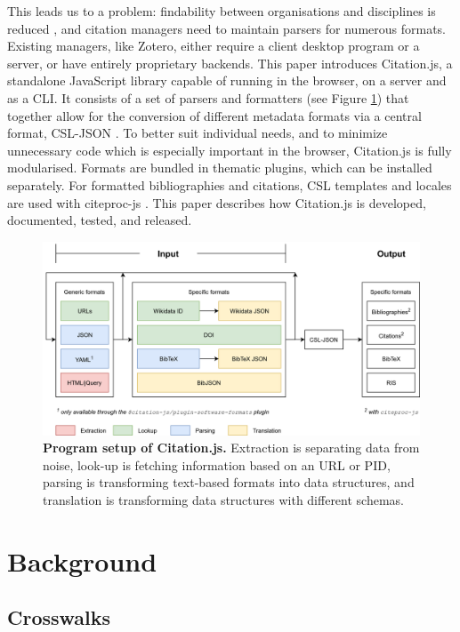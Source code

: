\documentclass[fleqn,10pt,lineno]{wlpeerj} %
\begin{document}
This leads us to a problem: findability between organisations and disciplines is reduced \citep{godby_repository_2004,zinn_crosswalking_2016}, and citation managers need to maintain parsers for numerous formats. Existing managers, like Zotero, either require a client desktop program or a server, or have entirely proprietary backends. This paper introduces Citation.js, a standalone JavaScript library capable of running in the browser, on a server and as a CLI. It consists of a set of parsers and formatters (see Figure \ref{fig:structure}) that together allow for the conversion of different metadata formats via a central format, CSL-JSON \citep{Bennett2018Juris-M/citeproc-js}. To better suit individual needs, and to minimize unnecessary code which is especially important in the browser, Citation.js is fully modularised. Formats are bundled in thematic plugins, which can be installed separately. For formatted bibliographies and citations, CSL templates and locales are used with citeproc-js \citep{zelle_csl_2012,Bennett2018Juris-M/citeproc-js}. This paper describes how Citation.js is developed, documented, tested, and released.

\begin{figure}[bt]
\centering
\includegraphics[width=\linewidth]{figures/architecture.png}
\caption{\textbf{Program setup of Citation.js.} Extraction is separating data from noise, look-up is fetching information based on an URL or PID, parsing is transforming text-based formats into data structures, and translation is transforming data structures with different schemas.}
\label{fig:structure}
\end{figure}

\section*{Background}

\subsection*{Crosswalks}
\end{document}
